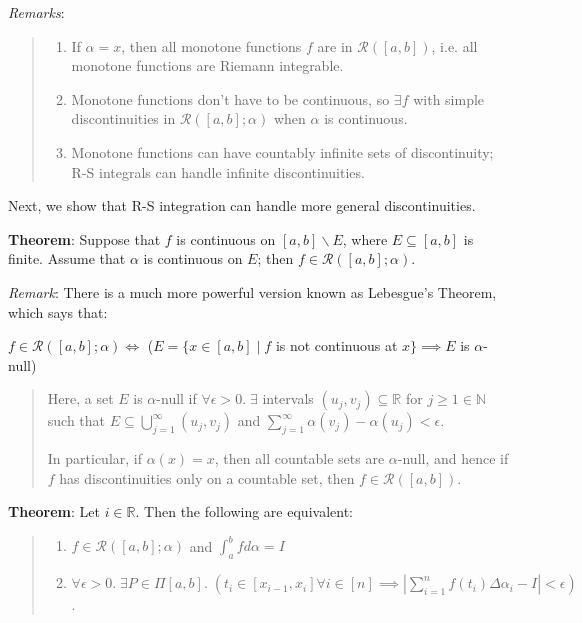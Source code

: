 \documentclass[11pt]{article}
\begin{document}
\emph{Remarks}:
\begin{quote}\vspace{-0.3cm}
	\begin{enumerate}
	\item If $\alpha = x$, then all monotone functions $f$ are in $\mathcal{R}([a,b])$, i.e. all monotone functions are Riemann integrable.
	\item Monotone functions don't have to be continuous, so $\exists f$ with simple discontinuities in $\mathcal{R}([a,b]; \alpha)$ when $\alpha$ is continuous.
	\item Monotone functions can have countably infinite sets of discontinuity; R-S integrals can handle infinite discontinuities.
	\end{enumerate}
\end{quote}

Next, we show that R-S integration can handle more general discontinuities.

\textbf{Theorem}: Suppose that $f$ is continuous on $[a,b] \backslash E$, where $E \subseteq [a,b]$ is finite. Assume that $\alpha$ is continuous on $E$; then $f \in \mathcal{R}([a,b]; \alpha)$.

\emph{Remark}: There is a much more powerful version known as Lebesgue's Theorem, which says that:
\begin{center}
$f \in \mathcal{R}([a,b]; \alpha) \iff$ ($E = \{x \in [a,b] \;|\; f$ is not continuous at $x\} \implies E$ is $\alpha$-null)
\end{center}
\begin{quote}
Here, a set $E$ is $\alpha$-null if $\forall \epsilon > 0.\; \exists$ intervals $(u_j, v_j) \subseteq \mathbb{R}$ for $j \geq 1 \in \mathbb{N}$ such that $E \subseteq \bigcup_{j=1}^\infty (u_j, v_j)$ and $\sum_{j=1}^\infty \alpha(v_j) - \alpha(u_j) < \epsilon$.

In particular, if $\alpha(x) = x$, then all countable sets are $\alpha$-null, and hence if $f$ has discontinuities only on a countable set, then $f \in \mathcal{R}([a,b])$.
\end{quote}

\textbf{Theorem}: Let $i \in \mathbb{R}$. Then the following are equivalent:
\begin{quote}\vspace{-0.3cm}
	\begin{enumerate}
	\item $f \in \mathcal{R}([a,b]; \alpha)$ and $\int_a^b f d\alpha = I$
	\item $\forall \epsilon > 0.\; \exists P \in \Pi[a,b].\; (t_i \in [x_{i-1}, x_i] \forall i \in [n] \implies |\sum_{i=1}^n f(t_i) \Delta \alpha_i - I| < \epsilon)$.
	\end{enumerate}
\end{quote}
\end{document}
